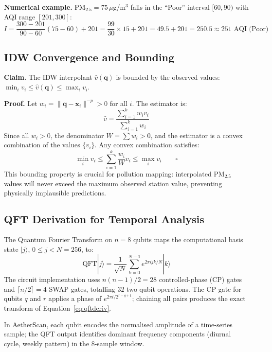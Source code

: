 \documentclass[12pt,a4paper]{article}
\newcommand{\ket}[1]{|#1\rangle}
\begin{document}
\noindent\textbf{Numerical example.}
PM$_{2.5} = 75\,\mu$g/m$^3$ falls in the ``Poor'' interval
$[60, 90)$ with AQI range $[201, 300]$:
\[
I = \frac{300 - 201}{90 - 60}(75 - 60) + 201
  = \frac{99}{30} \times 15 + 201
  = 49.5 + 201 = 250.5 \approx 251\text{ AQI (Poor)}
\]

\subsection{IDW Convergence and Bounding}
\label{app:derive:idw}

\textbf{Claim.} The IDW interpolant $\hat{v}(\mathbf{q})$ is bounded
by the observed values: $\min_i v_i \leq \hat{v}(\mathbf{q}) \leq \max_i v_i$.

\textbf{Proof.} Let $w_i = \|\mathbf{q} - \mathbf{x}_i\|^{-p} > 0$ for
all $i$. The estimator is:
\[
\hat{v} = \frac{\sum_{i=1}^k w_i v_i}{\sum_{i=1}^k w_i}
\]
Since all $w_i > 0$, the denominator $W = \sum w_i > 0$, and the
estimator is a convex combination of the values $\{v_i\}$.
Any convex combination satisfies:
\[
\min_i v_i \leq \sum_{i=1}^k \frac{w_i}{W} v_i \leq \max_i v_i \qquad \square
\]
This bounding property is crucial for pollution mapping: interpolated
PM$_{2.5}$ values will never exceed the maximum observed station value,
preventing physically implausible predictions.

\subsection{QFT Derivation for Temporal Analysis}
\label{app:derive:qft}

The Quantum Fourier Transform on $n = 8$ qubits maps the computational
basis state $\ket{j}$, $0 \leq j < N = 256$, to:
\begin{equation}
\text{QFT}\ket{j} = \frac{1}{\sqrt{N}} \sum_{k=0}^{N-1}
                    e^{2\pi i jk/N} \ket{k}
\label{eq:qftderiv}
\end{equation}
The circuit implementation uses $n(n-1)/2 = 28$ controlled-phase
(CP) gates and $\lceil n/2 \rceil = 4$ SWAP gates, totalling
32 two-qubit operations. The CP gate for qubits $q$ and $r$ applies
a phase of $e^{2\pi i / 2^{r-q+1}}$; chaining all pairs produces
the exact transform of Equation~\ref{eq:qftderiv}.

In AetherScan, each qubit encodes the normalised amplitude of a
time-series sample; the QFT output identifies dominant frequency
components (diurnal cycle, weekly pattern) in the 8-sample window.
\end{document}
